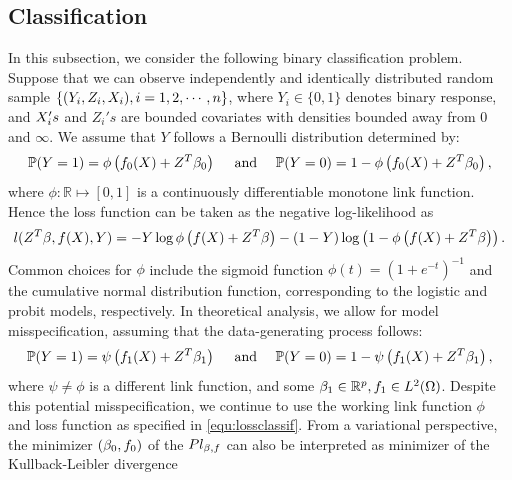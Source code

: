 

\subsection{Classification}
In this subsection, we consider the following binary classification problem.
Suppose that we can observe independently and identically distributed random sample $\{(Y_i,Z_i,X_i),i=1,2,\cdots,n\}$, where $Y_i \in \{0,1\}$ denotes binary response, and $X_{i}'s$ and $Z_{i}'s$ are bounded covariates with densities bounded away from $0$ and $\infty$. We assume that $Y$ follows a Bernoulli distribution determined by:
\begin{equation}
    \label{eq:partial_linear_classification}
    \mathbb{P}(Y = 1) = \phi\left(f_{0}(X) + Z^{T}\beta_{0}\right)  \quad\text{   and  }\quad  \mathbb{P}(Y = 0) = 1-\phi\left(f_{0}(X) + Z^{T}\beta_{0}\right),
\end{equation}
where $\phi: \mathbb{R} \mapsto [0,1]$ is a continuously differentiable monotone link function. 
Hence the loss function can be taken as the negative log-likelihood as
\begin{equation}\label{equ:lossclassif}
    l(Z^{T}\beta, f(X), Y) = -Y \log \phi\left(f(X) + Z^{T}\beta\right) - (1-Y )\log \left(1-\phi\left(f(X) + Z^{T}\beta\right)\right). 
\end{equation}
Common choices for $\phi$ include the sigmoid function $\phi(t)=(1+e^{-t})^{-1}$ and the cumulative normal distribution function, corresponding to the logistic and probit models, respectively. 
In theoretical analysis, we allow for model misspecification, assuming that the data-generating process follows: 
\begin{equation}\label{eq:partial_linear_classification_mis}
    \mathbb{P}(Y = 1) = \psi\left(f_{1}(X) + Z^{T}\beta_{1}\right)  \quad\text{   and  }\quad  \mathbb{P}(Y = 0) = 1-\psi\left(f_{1}(X) + Z^{T}\beta_{1}\right),
\end{equation}
where $\psi \neq \phi$ is a different link function, and some $\beta_{1} \in \mathbb{R}^{p},f_{1} \in L^2(\Omega)$. 
Despite this potential misspecification, we continue to use the working link function $\phi$ and loss function as specified in \eqref{equ:lossclassif}. 
From a variational perspective, the minimizer $(\beta_{0},f_{0})$ of the $Pl_{\beta,f}$ can also be interpreted as minimizer of the Kullback-Leibler divergence 
